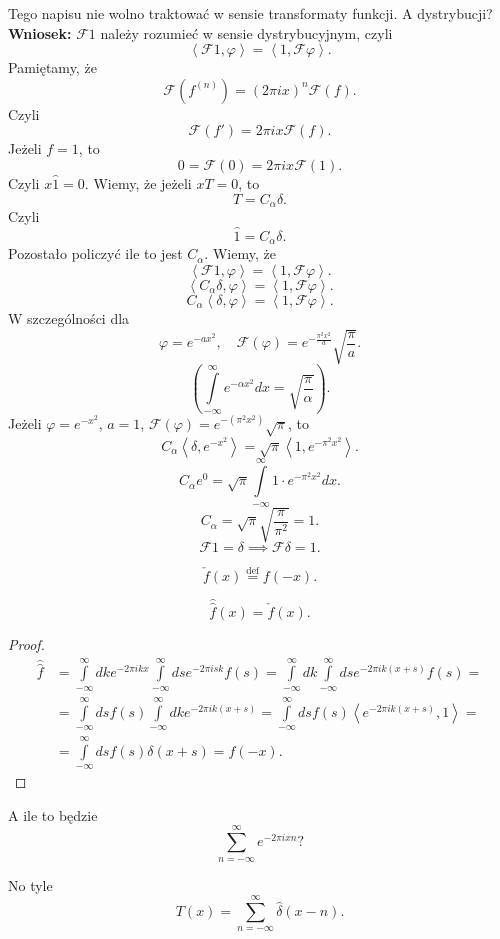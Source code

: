 \documentclass[../main.tex]{subfiles}
\begin{document}
Tego napisu nie wolno traktować w sensie transformaty funkcji. A dystrybucji?
\textbf{Wniosek:} $\mathcal{F}1$ należy rozumieć w sensie dystrybucyjnym, czyli
\[
    \left<\mathcal{F}1, \varphi \right> = \left<1, \mathcal{F}\varphi \right>
.\]
Pamiętamy, że
\[
    \mathcal{F}\left( f^{(n)} \right) = \left( 2\pi i x \right)^n \mathcal{F}\left( f \right)
.\]
Czyli
\[
    \mathcal{F}(f') = 2\pi i x \mathcal{F}(f)
.\]
Jeżeli $f = 1$, to
\[
    0 = \mathcal{F}(0) = 2\pi i x \mathcal{F}(1)
.\]
Czyli $x \hat{1} = 0$. Wiemy, że jeżeli $xT = 0$, to
\[
    T = C_\alpha \delta
.\]
Czyli
\[
    \hat{1} = C_\alpha \delta
.\]
Pozostało policzyć ile to jest $C_\alpha$.
Wiemy, że
\[
    \left<\mathcal{F}1, \varphi \right> = \left<1, \mathcal{F}\varphi \right>
.\]
\[
    \left<C_\alpha \delta, \varphi \right> = \left<1, \mathcal{F}\varphi \right>
.\]
\[
    C_\alpha\left<\delta, \varphi \right> = \left<1, \mathcal{F}\varphi \right>
.\]
W szczególności dla
\[
    \varphi = e^{-ax^2}, \quad \mathcal{F}(\varphi) = e^{-\frac{\pi^2x^2}{a}}\sqrt{\frac{\pi}{a}}
.\]
\[
    \left( \int\limits_{-\infty}^{\infty} e^{-\alpha x^2}dx = \sqrt{\frac{\pi}{\alpha}}   \right)
.\]
Jeżeli $\varphi = e^{-x^2}$, $a = 1$,  $\mathcal{F}(\varphi) = e^{-(\pi^2x^2)}\sqrt{\pi} $, to
\[
    C_\alpha \left<\delta, e^{-x^2} \right> = \sqrt{\pi} \left<1, e^{-\pi^2x^2} \right>
.\]
\[
    C_\alpha e^0 = \sqrt{\pi} \int\limits_{-\infty}^{\infty} 1\cdot e^{-\pi^2 x^2}dx
.\]
\[
    C_\alpha = \sqrt{\pi} \sqrt{\frac{\pi}{\pi^2}}  = 1
.\]
\[
    \mathcal{F}1 = \delta \implies \mathcal{F}\delta = 1
.\]
\begin{definicja}
    \[
        \check{f}(x) \overset{\text{def}}{=} f(-x).
    \]
\end{definicja}
\begin{tw}
    \[
        \hat{\hat{f}}(x) = \check{f}(x)
    .\]
\end{tw}
\begin{proof}
\begin{align*}
    \hat{\hat{f}} &= \int\limits_{-\infty}^{\infty} dk e^{-2\pi i kx}\int\limits_{-\infty}^{\infty} ds e^{-2\pi i s k} f(s) = \int\limits_{-\infty}^{\infty} dk \int\limits_{-\infty}^{\infty} ds e^{-2\pi i k(x+s)}f(s)=\\
    &= \int\limits_{-\infty}^{\infty} ds f(s) \int\limits_{-\infty}^{\infty} dk e^{-2\pi i k (x+s)} = \int\limits_{-\infty}^{\infty} ds f(s) \left<e^{-2\pi i k (x+s)}, 1 \right> = \\
    &= \int\limits_{-\infty}^{\infty} ds f(s) \delta(x+s) = f(-x)
.\end{align*}
\end{proof}
\begin{pytanie}
    A ile to będzie
    \[
        \sum_{n=-\infty}^{\infty} e^{-2\pi i x n}
    ?\]
\end{pytanie}
No tyle
\[
    T(x) = \sum_{n=-\infty}^{\infty} \hat{\delta}(x-n)
.\]
\end{document}
